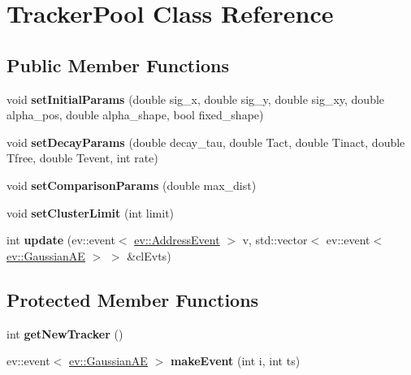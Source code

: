 \hypertarget{classTrackerPool}{}\section{Tracker\+Pool Class Reference}
\label{classTrackerPool}
\subsection*{Public Member Functions}
\begin{DoxyCompactItemize}
\item 
void {\bfseries set\+Initial\+Params} (double sig\+\_\+x, double sig\+\_\+y, double sig\+\_\+xy, double alpha\+\_\+pos, double alpha\+\_\+shape, bool fixed\+\_\+shape)\hypertarget{classTrackerPool_aba64099a18fc9b97eeb5b60f92ca849c}{}\label{classTrackerPool_aba64099a18fc9b97eeb5b60f92ca849c}

\item 
void {\bfseries set\+Decay\+Params} (double decay\+\_\+tau, double Tact, double Tinact, double Tfree, double Tevent, int rate)\hypertarget{classTrackerPool_aacfd7b8d8f8d47cf609e6e4ed64bbc1a}{}\label{classTrackerPool_aacfd7b8d8f8d47cf609e6e4ed64bbc1a}

\item 
void {\bfseries set\+Comparison\+Params} (double max\+\_\+dist)\hypertarget{classTrackerPool_a2ae5849c22bc24b688bd5ddf153e9e33}{}\label{classTrackerPool_a2ae5849c22bc24b688bd5ddf153e9e33}

\item 
void {\bfseries set\+Cluster\+Limit} (int limit)\hypertarget{classTrackerPool_a947f58bef9d46a290cb3ea6ec99d5fb8}{}\label{classTrackerPool_a947f58bef9d46a290cb3ea6ec99d5fb8}

\item 
int {\bfseries update} (ev\+::event$<$ \hyperlink{classev_1_1AddressEvent}{ev\+::\+Address\+Event} $>$ v, std\+::vector$<$ ev\+::event$<$ \hyperlink{classev_1_1GaussianAE}{ev\+::\+Gaussian\+AE} $>$ $>$ \&cl\+Evts)\hypertarget{classTrackerPool_a07051233ee59f248fbed73f3e8819e96}{}\label{classTrackerPool_a07051233ee59f248fbed73f3e8819e96}

\end{DoxyCompactItemize}
\subsection*{Protected Member Functions}
\begin{DoxyCompactItemize}
\item 
int {\bfseries get\+New\+Tracker} ()\hypertarget{classTrackerPool_afc17f68023420c6d43ac4b67afa3b14d}{}\label{classTrackerPool_afc17f68023420c6d43ac4b67afa3b14d}

\item 
ev\+::event$<$ \hyperlink{classev_1_1GaussianAE}{ev\+::\+Gaussian\+AE} $>$ {\bfseries make\+Event} (int i, int ts)\hypertarget{classTrackerPool_afc0696873f8071a97bdfeca16580d132}{}\label{classTrackerPool_afc0696873f8071a97bdfeca16580d132}

\end{DoxyCompactItemize}
